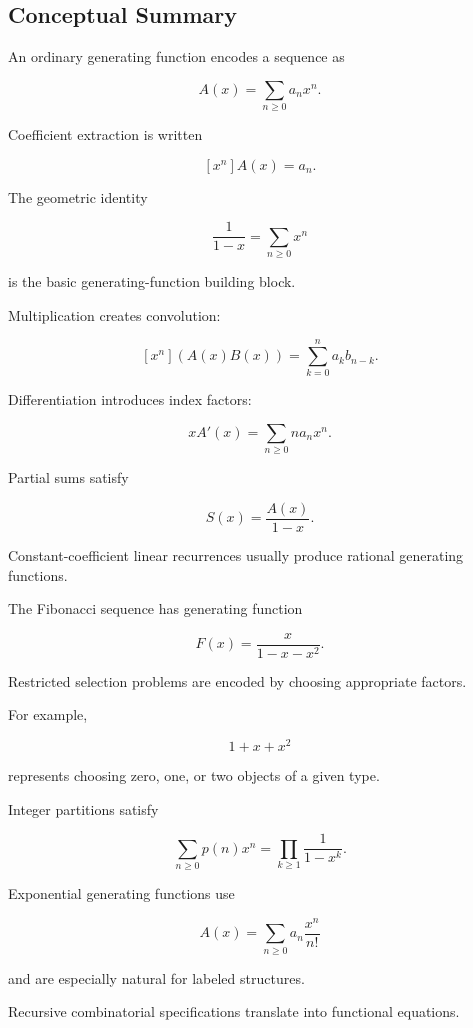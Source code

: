 \subsection{Conceptual Summary}
\label{subsec:generating-functions-summary}

An ordinary generating function encodes a sequence as

\[
\boxed{
A(x)
=
\sum_{n\geq0}a_nx^n.
}
\]

Coefficient extraction is written

\[
\boxed{
[x^n]A(x)=a_n.
}
\]

The geometric identity

\[
\boxed{
\frac{1}{1-x}
=
\sum_{n\geq0}x^n
}
\]

is the basic generating-function building block.

Multiplication creates convolution:

\[
\boxed{
[x^n](A(x)B(x))
=
\sum_{k=0}^{n}a_kb_{n-k}.
}
\]

Differentiation introduces index factors:

\[
\boxed{
xA'(x)
=
\sum_{n\geq0}na_nx^n.
}
\]

Partial sums satisfy

\[
\boxed{
S(x)
=
\frac{A(x)}{1-x}.
}
\]

Constant-coefficient linear recurrences usually produce rational
generating functions.

The Fibonacci sequence has generating function

\[
\boxed{
F(x)
=
\frac{x}{1-x-x^2}.
}
\]

Restricted selection problems are encoded by choosing appropriate
factors.

For example,

\[
1+x+x^2
\]

represents choosing zero, one, or two objects of a given type.

Integer partitions satisfy

\[
\boxed{
\sum_{n\geq0}p(n)x^n
=
\prod_{k\geq1}\frac{1}{1-x^k}.
}
\]

Exponential generating functions use

\[
\boxed{
A(x)
=
\sum_{n\geq0}
a_n\frac{x^n}{n!}
}
\]

and are especially natural for labeled structures.

Recursive combinatorial specifications translate into functional
equations.

